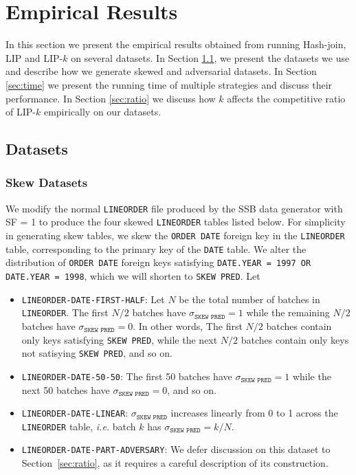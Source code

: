 \section{Empirical Results}\label{sec:experiment}

In this section we present the empirical results obtained from running Hash-join, LIP and LIP-$k$ on several datasets. In Section \ref{sec:dataset}, we present the datasets we use and describe how we generate skewed and adversarial datasets. In Section \ref{sec:time} we present the running time of multiple strategies and discuss their performance. In Section \ref{sec:ratio} we discuss how $k$ affects the competitive ratio of LIP-$k$ empirically on our datasets.

\subsection{Datasets}
\label{sec:dataset}


\subsubsection{Skew Datasets}

We modify the normal \texttt{LINEORDER} file produced by the SSB data generator with SF = 1 to produce the four skewed \texttt{LINEORDER} tables listed below.
For simplicity in generating skew tables, we skew the \texttt{ORDER DATE} foreign key in the \texttt{LINEORDER} table, corresponding to the primary key of the \texttt{DATE} table. 
We alter the distribution of \texttt{ORDER DATE} foreign keys satisfying \texttt{DATE.YEAR = 1997 OR DATE.YEAR = 1998}, which we will shorten to \texttt{SKEW PRED}.
Let 

\begin{itemize}
    \item \texttt{LINEORDER-DATE-FIRST-HALF}: Let $N$ be the total number of batches in \texttt{LINEORDER}. 
    The first $N/2$ batches have $\sigma_{\texttt{SKEW PRED}} = 1$ while the remaining $N/2$ batches have $\sigma_{\texttt{SKEW PRED}} = 0$.
    In other words, The first $N/2$ batches contain only keys satisfying \texttt{SKEW PRED}, 
    while the next $N/2$ batches contain only keys not satisying \texttt{SKEW PRED}, 
    and so on. 

    \item \texttt{LINEORDER-DATE-50-50}: The first 50 batches have $\sigma_{\texttt{SKEW PRED}} = 1$ while the next 50 batches have $\sigma_{\texttt{SKEW PRED}} = 0$, and so on.

    \item \texttt{LINEORDER-DATE-LINEAR}: $\sigma_{\texttt{SKEW PRED}}$ increases linearly from 0 to 1 across the \texttt{LINEORDER} table, 
    {\it i.e.} batch $k$ has $\sigma_{\texttt{SKEW PRED}} = k/N$.

    \item \texttt{LINEORDER-DATE-PART-ADVERSARY}: We defer discussion on this dataset to Section~\ref{sec:ratio}, 
    as it requires a careful description of its construction.

\end{itemize} 







